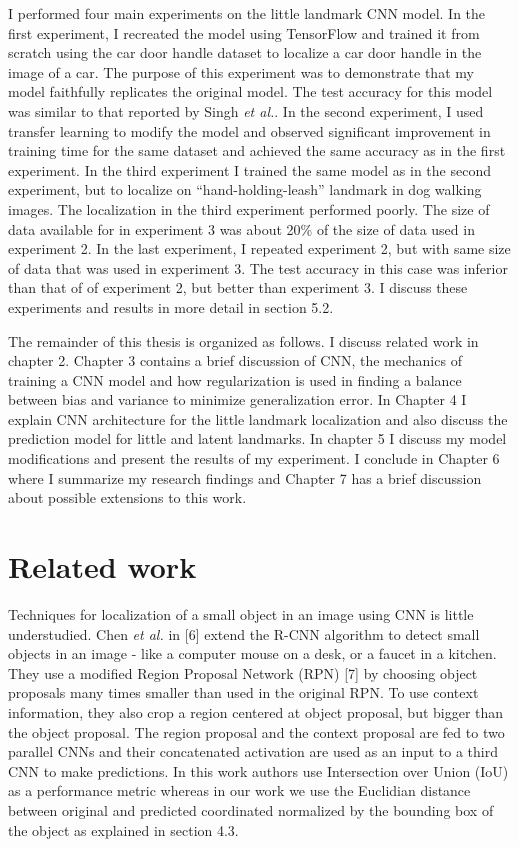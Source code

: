 \documentclass [11pt,letterpaper ,twoside ,openany ]{report}
\begin{document}
    I performed four main experiments on the little landmark CNN model. In the first experiment, I recreated the model using TensorFlow\textsuperscript{\textregistered} and trained it from scratch using the car door handle dataset to localize a car door handle in the image of a car. The purpose of this experiment was to demonstrate that my model faithfully replicates the original model. The test accuracy for this model was similar to that reported by Singh \textit{et al.}. In the second experiment, I used transfer learning to modify the model and observed significant improvement in training time for the same dataset and achieved the same accuracy as in the first experiment. In the third experiment I trained the same model as in the second experiment, but to localize on ``hand-holding-leash'' landmark in dog walking images. The localization in the third experiment performed poorly. The size of data available for in experiment 3 was about 20\% of the size of data used in experiment 2. In the last experiment, I repeated experiment 2, but with same size of data that was used in experiment 3. The test accuracy in this case was inferior than that of of experiment 2, but better than experiment 3. I discuss these experiments and results in more detail in section 5.2.

    The remainder of this thesis is organized as follows. I discuss related work in chapter 2. Chapter 3 contains a brief discussion of CNN, the mechanics of training a CNN model and how regularization is used in finding a balance between bias and variance to minimize generalization error. In Chapter 4 I explain CNN architecture for the little landmark localization and also discuss the prediction model for little and latent landmarks. In chapter 5 I discuss my model modifications and present the results of my experiment. I conclude in Chapter 6 where I summarize my research findings and Chapter 7 has a brief discussion about possible extensions to this work.

    \chapter{Related work}
    \doublespacing
    Techniques for localization of a small object in an image using CNN is little understudied. Chen \textit{et al.} in [6] extend the R-CNN algorithm to detect small objects in an image - like a computer mouse on a desk, or a faucet in a kitchen. They use a modified Region Proposal Network (RPN) [7] by choosing object proposals many times smaller than used in the original RPN. To use context information, they also crop a region centered at object proposal, but bigger than the object proposal. The region proposal and the context proposal are fed to two parallel CNNs and their concatenated activation are used as an input to a third CNN to make predictions. In this work authors use Intersection over Union (IoU) as a performance metric whereas in our work we use the Euclidian distance between original and predicted coordinated normalized by the bounding box of the object as explained in section 4.3. 
\end{document}
